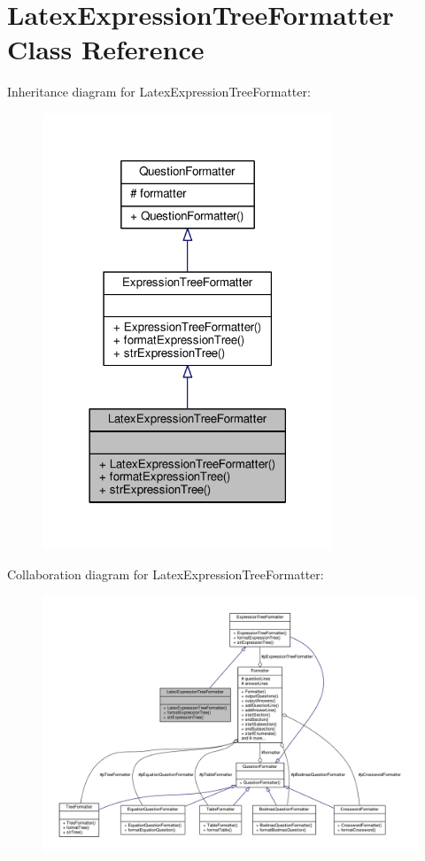 \hypertarget{classLatexExpressionTreeFormatter}{}\section{Latex\+Expression\+Tree\+Formatter Class Reference}
\label{classLatexExpressionTreeFormatter}


Inheritance diagram for Latex\+Expression\+Tree\+Formatter\+:
\nopagebreak
\begin{figure}[H]
\begin{center}
\leavevmode
\includegraphics[width=246pt]{classLatexExpressionTreeFormatter__inherit__graph}
\end{center}
\end{figure}


Collaboration diagram for Latex\+Expression\+Tree\+Formatter\+:
\nopagebreak
\begin{figure}[H]
\begin{center}
\leavevmode
\includegraphics[width=350pt]{classLatexExpressionTreeFormatter__coll__graph}
\end{center}
\end{figure}
